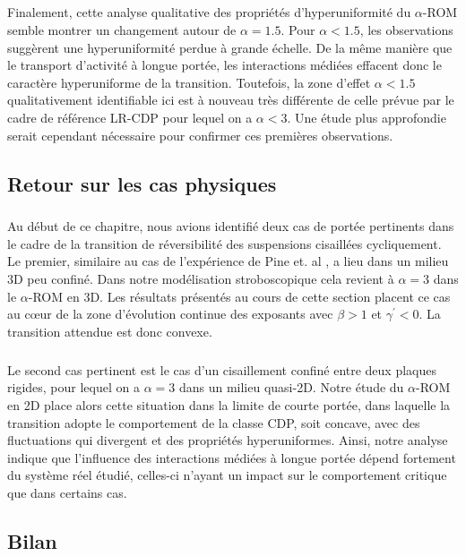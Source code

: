 \subparagraph{}Finalement, cette analyse qualitative des propriétés d'hyperuniformité du $\alpha$-ROM semble montrer un changement autour de $\alpha = 1.5$. Pour $\alpha<1.5$, les observations suggèrent une hyperuniformité perdue à grande échelle. De la même manière que le transport d'activité à longue portée, les interactions médiées effacent donc le caractère hyperuniforme de la transition. Toutefois, la zone d'effet $\alpha < 1.5$ qualitativement identifiable ici est à nouveau très différente de celle prévue par le cadre de référence LR-CDP pour lequel on a $\alpha<3$. Une étude plus approfondie serait cependant nécessaire pour confirmer ces premières observations.

\subsection{Retour sur les cas physiques}

\subparagraph{}Au début de ce chapitre, nous avions identifié deux cas de portée pertinents dans le cadre de la transition de réversibilité des suspensions cisaillées cycliquement. Le premier, similaire au cas de l'expérience de Pine et. al \cite{pine_chaos_2005}, a lieu dans un milieu 3D peu confiné. Dans notre modélisation stroboscopique cela revient à $\alpha = 3$ dans le $\alpha$-ROM en 3D. Les résultats présentés au cours de cette section placent ce cas au cœur de la zone d'évolution continue des exposants avec $\beta > 1$ et $\gamma^\prime < 0$. La transition attendue est donc convexe.

\subparagraph{}Le second cas pertinent est le cas d'un cisaillement confiné entre deux plaques rigides, pour lequel on a $\alpha = 3$ dans un milieu quasi-2D. Notre étude du $\alpha$-ROM en 2D place alors cette situation dans la limite de courte portée, dans laquelle la transition adopte le comportement de la classe CDP, soit concave, avec des fluctuations qui divergent et des propriétés hyperuniformes. Ainsi, notre analyse indique que l'influence des interactions médiées à longue portée dépend fortement du système réel étudié, celles-ci n'ayant un impact sur le comportement critique que dans certains cas.

\subsection*{Bilan}

